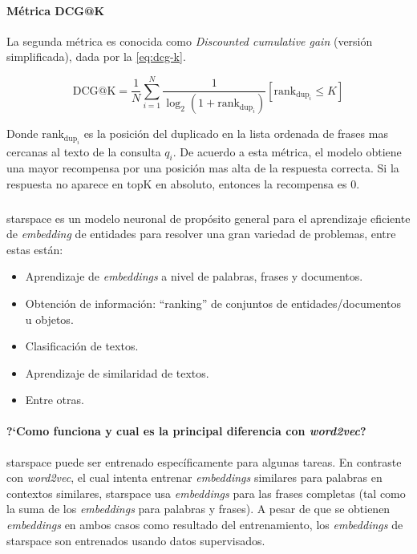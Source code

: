 \paragraph{Métrica DCG@K}
La segunda métrica es conocida como \emph{Discounted cumulative gain} (versión simplificada), dada por la \cref{eq:dcg-k}.

\begin{equation} \label{eq:dcg-k}
  \mathrm{DCG@K} = \frac{1}{N} \sum_{i=1}^{N} \frac{1}{\log_2(1+\mathrm{rank}_{\mathrm{dup}_i})} [\mathrm{rank}_{\mathrm{dup}_i} \le K]
\end{equation}

Donde $\mathrm{rank}_{\mathrm{dup}_i}$ es la posición del duplicado en la lista ordenada de frases mas cercanas al texto de la consulta $q_i$. De acuerdo a esta métrica, el modelo obtiene una mayor recompensa por una posición mas alta de la respuesta correcta. Si la respuesta no aparece en $\mathrm{topK}$ en absoluto, entonces la recompensa es $0$.

\subsubsection{}
\gls{starspace} \cite{starspace} es un modelo neuronal de propósito general para el aprendizaje eficiente de \emph{embedding} de entidades para resolver una gran variedad de problemas, entre estas están:
\begin{itemize}
\item Aprendizaje de \emph{embeddings} a nivel de palabras, frases y documentos.
\item Obtención de información: ``ranking'' de conjuntos de entidades/documentos u objetos.
\item Clasificación de textos.
\item Aprendizaje de similaridad de textos.
\item Entre otras.
\end{itemize}

\paragraph{?`Como funciona y cual es la principal diferencia con \emph{word2vec}?}
\gls{starspace} puede ser entrenado específicamente para algunas tareas. En contraste con \emph{word2vec}, el cual intenta entrenar \emph{embeddings} similares para palabras en contextos similares, \gls{starspace} usa \emph{embeddings} para las frases completas (tal como la suma de los \emph{embeddings} para palabras y frases). A pesar de que se obtienen \emph{embeddings} en ambos casos como resultado del entrenamiento, los \emph{embeddings} de \gls{starspace} son entrenados usando datos supervisados.

